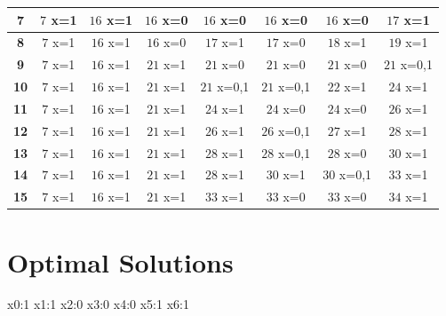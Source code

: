 \documentclass{article}
\begin{document}
\begin{center}
\begin{tabular}{|c||c|c|c|c|c|c|c|}
        \hline
        \textbf{7}& \cellcolor[HTML]{3FFC45}$7$ x={1} & \cellcolor[HTML]{3FFC45}$16$ x={1} & \cellcolor[HTML]{FC3F3F}$16$ x={0}& \cellcolor[HTML]{FC3F3F}$16$ x={0}& \cellcolor[HTML]{FC3F3F}$16$ x={0}& \cellcolor[HTML]{FC3F3F}$16$ x={0}& \cellcolor[HTML]{3FFC45}$17$ x={1} \\
        \hline
        \textbf{8}& \cellcolor[HTML]{3FFC45}$7$ x={1} & \cellcolor[HTML]{3FFC45}$16$ x={1} & \cellcolor[HTML]{FC3F3F}$16$ x={0}& \cellcolor[HTML]{3FFC45}$17$ x={1} & \cellcolor[HTML]{FC3F3F}$17$ x={0}& \cellcolor[HTML]{3FFC45}$18$ x={1} & \cellcolor[HTML]{3FFC45}$19$ x={1} \\
        \hline
        \textbf{9}& \cellcolor[HTML]{3FFC45}$7$ x={1} & \cellcolor[HTML]{3FFC45}$16$ x={1} & \cellcolor[HTML]{3FFC45}$21$ x={1} & \cellcolor[HTML]{FC3F3F}$21$ x={0}& \cellcolor[HTML]{FC3F3F}$21$ x={0}& \cellcolor[HTML]{FC3F3F}$21$ x={0}& \cellcolor[HTML]{3F62FC}$21$ x={0,1}\\
        \hline
        \textbf{10}& \cellcolor[HTML]{3FFC45}$7$ x={1} & \cellcolor[HTML]{3FFC45}$16$ x={1} & \cellcolor[HTML]{3FFC45}$21$ x={1} & \cellcolor[HTML]{3F62FC}$21$ x={0,1}& \cellcolor[HTML]{3F62FC}$21$ x={0,1}& \cellcolor[HTML]{3FFC45}$22$ x={1} & \cellcolor[HTML]{3FFC45}$24$ x={1} \\
        \hline
        \textbf{11}& \cellcolor[HTML]{3FFC45}$7$ x={1} & \cellcolor[HTML]{3FFC45}$16$ x={1} & \cellcolor[HTML]{3FFC45}$21$ x={1} & \cellcolor[HTML]{3FFC45}$24$ x={1} & \cellcolor[HTML]{FC3F3F}$24$ x={0}& \cellcolor[HTML]{FC3F3F}$24$ x={0}& \cellcolor[HTML]{3FFC45}$26$ x={1} \\
        \hline
        \textbf{12}& \cellcolor[HTML]{3FFC45}$7$ x={1} & \cellcolor[HTML]{3FFC45}$16$ x={1} & \cellcolor[HTML]{3FFC45}$21$ x={1} & \cellcolor[HTML]{3FFC45}$26$ x={1} & \cellcolor[HTML]{3F62FC}$26$ x={0,1}& \cellcolor[HTML]{3FFC45}$27$ x={1} & \cellcolor[HTML]{3FFC45}$28$ x={1} \\
        \hline
        \textbf{13}& \cellcolor[HTML]{3FFC45}$7$ x={1} & \cellcolor[HTML]{3FFC45}$16$ x={1} & \cellcolor[HTML]{3FFC45}$21$ x={1} & \cellcolor[HTML]{3FFC45}$28$ x={1} & \cellcolor[HTML]{3F62FC}$28$ x={0,1}& \cellcolor[HTML]{FC3F3F}$28$ x={0}& \cellcolor[HTML]{3FFC45}$30$ x={1} \\
        \hline
        \textbf{14}& \cellcolor[HTML]{3FFC45}$7$ x={1} & \cellcolor[HTML]{3FFC45}$16$ x={1} & \cellcolor[HTML]{3FFC45}$21$ x={1} & \cellcolor[HTML]{3FFC45}$28$ x={1} & \cellcolor[HTML]{3FFC45}$30$ x={1} & \cellcolor[HTML]{3F62FC}$30$ x={0,1}& \cellcolor[HTML]{3FFC45}$33$ x={1} \\
        \hline
        \textbf{15}& \cellcolor[HTML]{3FFC45}$7$ x={1} & \cellcolor[HTML]{3FFC45}$16$ x={1} & \cellcolor[HTML]{3FFC45}$21$ x={1} & \cellcolor[HTML]{3FFC45}$33$ x={1} & \cellcolor[HTML]{FC3F3F}$33$ x={0}& \cellcolor[HTML]{FC3F3F}$33$ x={0}& \cellcolor[HTML]{3FFC45}$34$ x={1} \\
        \hline
    \end{tabular}
\end{center}


\section{Optimal Solutions}
x0:1 x1:1 x2:0 x3:0 x4:0 x5:1 x6:1 
\end{document}
